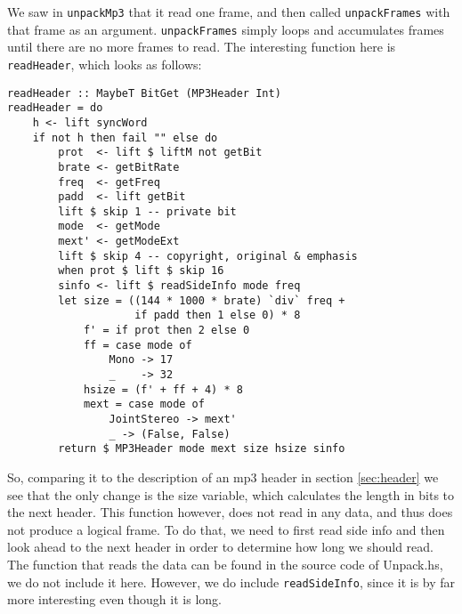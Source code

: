 \documentclass[a4paper,12pt]{article}
\begin{document}
    We saw in \texttt{unpackMp3} that it read one frame, and then called 
    \texttt{unpackFrames} with that frame as an argument. \texttt{unpackFrames}
    simply loops and accumulates frames until there are no more frames to read.
    The interesting function here is \texttt{readHeader}, which looks as
    follows:
    \begin{lstlisting}
readHeader :: MaybeT BitGet (MP3Header Int)
readHeader = do
    h <- lift syncWord
    if not h then fail "" else do
        prot  <- lift $ liftM not getBit
        brate <- getBitRate
        freq  <- getFreq
        padd  <- lift getBit
        lift $ skip 1 -- private bit
        mode  <- getMode
        mext' <- getModeExt
        lift $ skip 4 -- copyright, original & emphasis
        when prot $ lift $ skip 16
        sinfo <- lift $ readSideInfo mode freq
        let size = ((144 * 1000 * brate) `div` freq +
                    if padd then 1 else 0) * 8
            f' = if prot then 2 else 0
            ff = case mode of
                Mono -> 17
                _    -> 32
            hsize = (f' + ff + 4) * 8
            mext = case mode of
                JointStereo -> mext'
                _ -> (False, False)
        return $ MP3Header mode mext size hsize sinfo
    \end{lstlisting}
    So, comparing it to the description of an mp3 header in section
    \ref{sec:header} we see that the only change is the size variable, which
    calculates the length in bits to the next header. This function however,
    does not read in any data, and thus does not produce a logical frame. To do
    that, we need to first read side info and then look ahead to the next
    header in order to determine how long we should read. The function that
    reads the data can be found in the source code of Unpack.hs, we do not
    include it here. However, we do include \texttt{readSideInfo}, since it is
    by far more interesting even though it is long.
\end{document}
